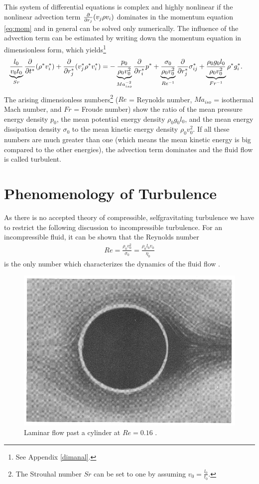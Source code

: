 This system of differential equations is complex and highly nonlinear if the
nonlinear advection term $\frac{\partial}{\partial r_j}(v_j \rho v_i)$ dominates in the momentum
equation \eqref{eq:mom} and in general can be solved only numerically.
The influence of the advection term can be estimated by writing down the 
momentum equation in dimensionless form, which yields\footnote{See Appendix
\ref{dimanal}.}
\begin{align}
\underbrace{\frac{l_0}{v_0 t_0}}_{Sr}\frac{\partial}{\partial t^*}(\rho^* v_i^*) 
+ \frac{\partial}{\partial r_j^*}(v_j^* \rho^* v_i^*) &= 
-\underbrace{\frac{p_0}{\rho_0 v_0^2}}_{Ma^{-2}_{iso}}\frac{\partial}{\partial r_i^*}p^* 
+\underbrace{\frac{\sigma_0}{\rho_0 v_0^2}}_{Re^{-1}}\frac{\partial}{\partial r_j^*}\sigma_{ij}^*
+\underbrace{\frac{\rho_0 g_0 l_0}{\rho_0 v_0^2}}_{Fr^{-1}} \rho^* g_i^*.
\end{align}
The arising dimensionless numbers\footnote{The Strouhal number
 $Sr$ can be set to one by assuming $v_0=\frac{l_0}{t_0}$.}
($Re$ = Reynolds number, $Ma_{iso}$ =
isothermal Mach number, and $Fr$ = Froude number)
show the ratio of the mean pressure energy density $p_0$, the
mean potential energy density $\rho_0 g_0 l_0$, and the mean energy dissipation
density $\sigma_0$ to the mean kinetic energy density $\rho_0 v_0^2$. 
If all these numbers are much greater than one (which means the mean
kinetic energy is big compared to the other energies), the advection term
dominates and the fluid flow is called turbulent. 

\section{Phenomenology of Turbulence}
As there is no accepted theory of compressible, selfgravitating turbulence we
have to restrict the following discussion to incompressible turbulence. For an
incompressible fluid, it can be shown that the Reynolds number
\begin{align}
Re=\frac{\rho_0 v_0^2}{\sigma_0}=\frac{\rho_0 l_0 v_0}{\eta_0} 
\end{align}
is the only number which characterizes the dynamics of the fluid flow
\citep{Feynman1964}. 

\begin{figure}[tp]
\centering
\includegraphics[width=0.7\linewidth]{chapter2/Reynolds0.eps}
\caption{Laminar flow past a cylinder at $Re=0.16$ \citep{Frisch1995}.}
\label{fig:rey0}
\end{figure}

